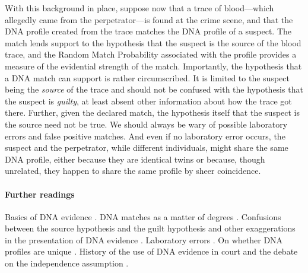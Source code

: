 \documentclass[10pt]{article}
\begin{document}
With this background in place, suppose now that a trace of blood---which allegedly came from the perpetrator---is found at the crime scene, and that the DNA profile created from the trace matches 
the DNA profile of a suspect. The match
lends support to the hypothesis that the suspect is the source of the blood trace, and the Random Match Probability associated with the profile provides 
a measure of the evidential strength of the match. %
Importantly, the hypothesis that a DNA 
match can support is rather circumscribed. It is limited to the suspect being the \textit{source} of the trace and 
should not be confused with the hypothesis that the suspect is \textit{guilty}, at least 
absent other information about how the trace got there. 
Further, given the declared match, the hypothesis itself that the suspect is the source 
need not be true. We should always be wary 
of possible laboratory errors and false positive matches. 
And even if no laboratory error occurs, the suspect and the perpetrator, while different individuals, might share 
the same DNA profile, either because they are identical twins or because, though unrelated, 
they happen to share the same profile by sheer coincidence. 

\paragraph{Further readings} 
Basics of DNA evidence \citep{wasserman2008, kayeSensabaugh2000}.
DNA matches as a matter of degrees \citep{kaye1993}.
Confusions between the source hypothesis and the guilt hypothesis and other exaggerations 
in the presentation of DNA evidence
\citep{koehler1993}.
Laboratory errors \citep{thompsonEtAl2003}.
On whether DNA profiles are unique \citep{weir2007, KoehlerEtAl2010, kaye2013}.
History of the use of DNA evidence in court and the debate on the 
independence assumption \cite{kaye2010}.
\end{document}
